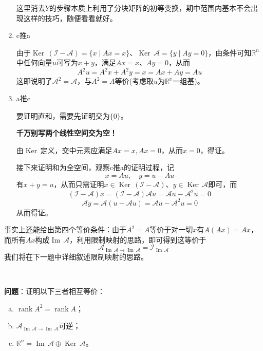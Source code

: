 \documentclass[a4paper,UTF8,fontset=windows]{ctexart}
\DeclareMathOperator{\rank}{rank}
\DeclareMathOperator{\im}{Im\,}
\DeclareMathOperator{\Ker}{Ker\,}
\newcommand*{\ma}{\mathcal{A}}
\newcommand*{\mi}{\mathcal{I}}
\newcommand*{\note}{\noindent *}
\begin{document}
\begin{enumerate}
    \note 这里消去$Y$的步骤本质上利用了分块矩阵的初等变换，期中范围内基本不会出现这样的技巧，随便看看就好。

    \item c推a
    
    由于$\Ker(\mi-\ma)=\{x\mid Ax=x\}$、$\Ker\ma=\{y\mid Ay=0\}$，由条件可知$\mathbb{R}^n$中任何向量$u$可写为$x+y$，满足$Ax=x$、$Ay=0$，从而
    $$A^2u=A^2x+A^2y=x=Ax+Ay=Au$$
    这即说明了$\ma^2=\ma$，与$A^2=A$等价(考虑取$u$为$\mathbb{R^n}$一组基)。

    \item a推c
    
    要证明直和，需要先证明交为$\{0\}$。
    
    \note \textbf{千万别写两个线性空间交为空！}

    由$\Ker$定义，交中元素应满足$Ax=x,Ax=0$，从而$x=0$，得证。

    接下来证明和为全空间，观察c推a的证明过程，记
    $$x=Au,\quad y=u-Au$$
    有$x+y=u$，从而只需证明$x\in\Ker(\mi-\ma)$、$y\in\Ker\ma$即可，而
    $$(\mi-\ma)x=(\mi-\ma)\ma u=\ma u-\ma^2u=0$$
    $$\ma y=\ma(u-\ma u)=\ma u-\ma^2u=0$$
    从而得证。
\end{enumerate}

事实上还能给出第四个等价条件：由于$A^2=A$等价于对一切$x$有$A(Ax)=Ax$，而所有$Ax$构成$\im\ma$，利用限制映射的思路，即可得到这等价于
$$\ma_{\im\ma\to\im\ma}=\mi_{\im\ma}$$
我们将在下一题中详细叙述限制映射的思路。

\

\textbf{问题}：证明以下三者相互等价：
\begin{enumerate}[a.]
    \item $\rank A^2=\rank A$；
    \item $\ma_{\im\ma\to\im\ma}$可逆；
    \item $\mathbb{R}^n=\im\ma\oplus\Ker\ma$。
\end{enumerate}
\end{document}
